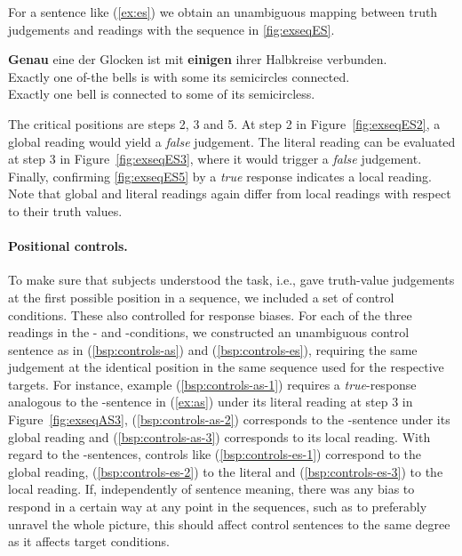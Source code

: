 \documentclass[fleqn,reqno,10pt,draft]{article}
\newcommand{\as}{\acro{as}}
\renewcommand{\es}{\acro{es}}
\renewcommand{\mymark}[1]{\textbf{#1}}
\begin{document}
%
For a sentence like (\ref{ex:es}) we obtain an unambiguous mapping
between truth judgements and readings with the sequence in
\ref{fig:exseqES}.
\begin{exe}
\ex \label{ex:es} \gll \mymark{Genau} eine der Glocken ist mit
  \mymark{einigen} ihrer Halbkreise verbunden.\\ 
  Exactly one of-the bells is with some its semicircles connected.\\
  \trans Exactly one bell is connected to some of its semicircless.
\end{exe}
The critical positions are steps 2, 3 and 5. At step 2 in
Figure~\ref{fig:exseqES2}, a global reading would yield a \emph{false}
judgement. The literal reading can be evaluated at step 3 in
Figure~\ref{fig:exseqES3}, where it would trigger a \emph{false}
judgement. Finally, confirming \ref{fig:exseqES5} by a \emph{true}
response indicates a local reading. Note that global and literal
readings again differ from local readings with respect to their truth
values.


\paragraph{Positional controls.} To make sure that subjects understood
the task, i.e., gave truth-value judgements at the first possible
position in a sequence, we included a set of control conditions. These
also controlled for response biases. For each of the three readings in
the \as- and \es-conditions, we constructed an unambiguous control
sentence as in (\ref{bsp:controls-as}) and (\ref{bsp:controls-es}),
requiring the same judgement at the identical position in the same
sequence used for the respective targets. For instance, example
(\ref{bsp:controls-as-1}) requires a \emph{true}-response analogous to
the \as-sentence in (\ref{ex:as}) under its literal reading at step 3
in Figure~\ref{fig:exseqAS3}, (\ref{bsp:controls-as-2}) corresponds to
the \as-sentence under its global reading and
(\ref{bsp:controls-as-3}) corresponds to its local reading. With
regard to the \es-sentences, controls like (\ref{bsp:controls-es-1})
correspond to the global reading, (\ref{bsp:controls-es-2}) to the
literal and (\ref{bsp:controls-es-3}) to the local reading. If,
independently of sentence meaning, there was any bias to respond in a
certain way at any point in the sequences, such as to preferably
unravel the whole picture, this should affect control sentences to the
same degree as it affects target conditions.
\end{document}
